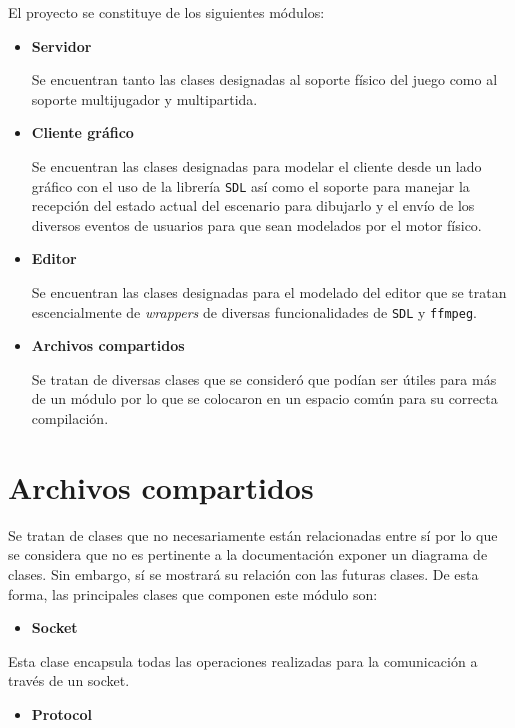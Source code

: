 \documentclass[a4paper]{article}
\begin{document}
El proyecto se constituye de los siguientes módulos:

\begin{itemize}
	\item \textbf{Servidor}

Se encuentran tanto las clases designadas al soporte físico del juego como al soporte multijugador y multipartida.

	\item \textbf{Cliente gráfico}
	
Se encuentran las clases designadas para modelar el cliente desde un lado gráfico con el uso de la librería \texttt{SDL} así como el soporte para manejar la recepción del estado actual del escenario para dibujarlo y el envío de los diversos eventos de usuarios para que sean modelados por el motor físico.
	\item \textbf{Editor}
	
Se encuentran las clases designadas para el modelado del editor que se tratan escencialmente de \textit{wrappers} de diversas funcionalidades de \texttt{SDL} y \texttt{ffmpeg}.

	\item \textbf{Archivos compartidos}
	
Se tratan de diversas clases que se consideró que podían ser útiles para más de un módulo por lo que se colocaron en un espacio común para su correcta compilación.
\end{itemize}

\section{Archivos compartidos}

Se tratan de clases que no necesariamente están relacionadas entre sí por lo que se considera que no es pertinente a la documentación exponer un diagrama de clases. Sin embargo, sí se mostrará su relación con las futuras clases. De esta forma, las principales clases que componen este módulo son:

\begin{itemize}
	\item \textbf{Socket}
\end{itemize}

Esta clase encapsula todas las operaciones realizadas para la comunicación a través de un socket.

\begin{itemize}
	\item \textbf{Protocol}
\end{itemize}
\end{document}
